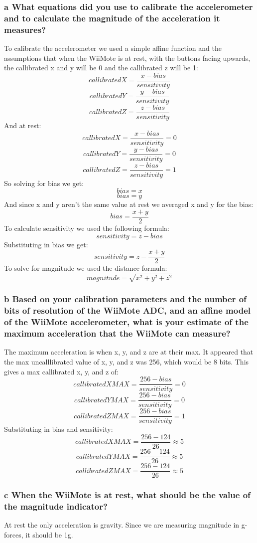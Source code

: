 \documentclass[10pt,a4paper]{article}
\begin{document}
    \subsubsection*{a What equations did you use to calibrate the accelerometer and to calculate the magnitude of the acceleration it measures?}
      To calibrate the accelerometer we used a simple affine function and the assumptions that when the WiiMote is at rest, with the buttons facing upwards, the callibrated x and y will be 0 and the callibrated z will be 1: 
        \[callibratedX = \frac{x - bias}{sensitivity}\] 
        \[callibratedY = \frac{y - bias}{sensitivity}\] 
        \[callibratedZ = \frac{z - bias}{sensitivity}\] 
      And at rest:
        \[callibratedX = \frac{x - bias}{sensitivity} = 0\] 
        \[callibratedY = \frac{y - bias}{sensitivity} = 0\] 
        \[callibratedZ = \frac{z - bias}{sensitivity} = 1\] 
      So solving for bias we get:
        \[bias = x\]
        \[bias = y\]
      And since x and y aren't the same value at rest we averaged x and y for the bias:
        \[bias = \frac{x + y}{2}\]
      To calculate sensitivity we used the following formula:
        \[sensitivity = z - bias\]
      Substituting in bias we get:
        \[sensitivity = z - \frac{x + y}{2}\]
      To solve for magnitude we used the distance formula:
        \[magnitude = \sqrt{x^2 + y^2 + z^2}\]
    \subsubsection*{b Based on your calibration parameters and the number of bits of resolution of the WiiMote ADC, and an affine model of the WiiMote accelerometer, what is your estimate of the maximum acceleration that the WiiMote can measure?}
      The maximum acceleration is when x, y, and z are at their max. It appeared that the max uncalllibrated value of x, y, and z was 256, which would be 8 bits. This gives a max callibrated x, y, and z of:
        \[callibratedXMAX = \frac{256 - bias}{sensitivity} = 0\] 
        \[callibratedYMAX = \frac{256 - bias}{sensitivity} = 0\] 
        \[callibratedZMAX = \frac{256 - bias}{sensitivity} = 1\]
      Substituting in bias and sensitivity:
        \[callibratedXMAX = \frac{256 - 124}{26} \approx 5\] 
        \[callibratedYMAX = \frac{256 - 124}{26} \approx 5\] 
        \[callibratedZMAX = \frac{256 - 124}{26} \approx 5\]
    \subsubsection*{c When the WiiMote is at rest, what should be the value of the magnitude indicator?}
      At rest the only acceleration is gravity. Since we are measuring magnitude in g-forces, it should be 1g. 
\end{document}

